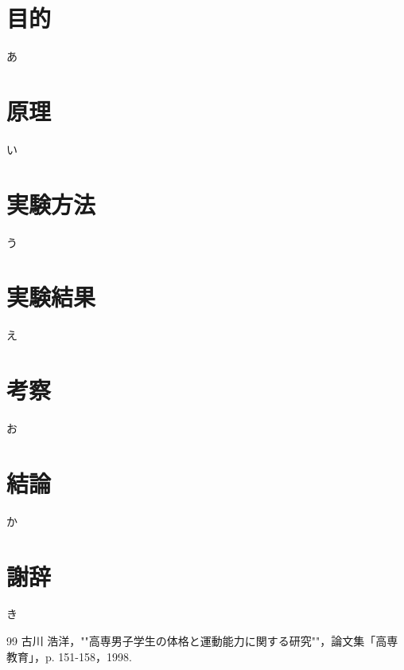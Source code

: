 \documentclass[11pt,dvipdfmx]{jarticle}
\begin{document}

\section{目的}
あ

\section{原理}
い

\section{実験方法}
う

\section{実験結果}
え

\section{考察}
お

\section{結論}
か

\section{謝辞}
き


\begin{thebibliography}{99}
 古川 浩洋，""高専男子学生の体格と運動能力に関する研究""，論文集「高専教育」，p. 151-158，1998.
\end{thebibliography}
\end{document}
